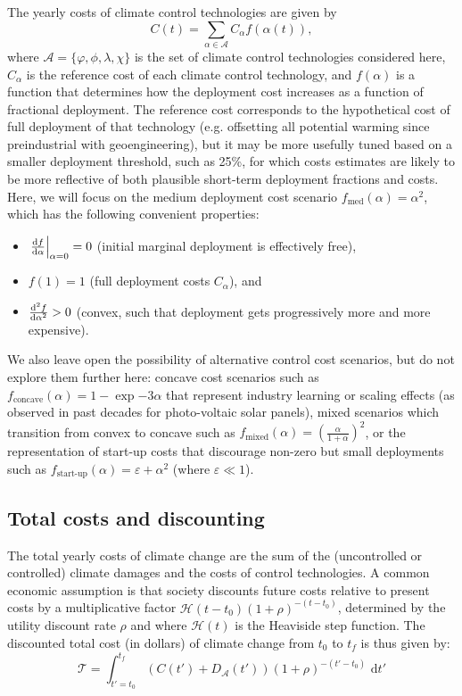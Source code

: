 \documentclass{article}
\begin{document}
The yearly costs of climate control technologies are given by
\begin{equation}
    C(t) = \sum_{\alpha \in \mathcal{A}} C_{\alpha} f(\alpha(t)),
\end{equation}
where $\mathcal{A} = \{ \varphi, \phi, \lambda, \chi \}$ is the set of climate control technologies considered here, $C_{\alpha}$ is the reference cost of each climate control technology, and $f(\alpha)$ is a function that determines how the deployment cost increases as a function of fractional deployment. The reference cost corresponds to the hypothetical cost of full deployment of that technology (e.g. offsetting all potential warming since preindustrial with geoengineering), but it may be more usefully tuned based on a smaller deployment threshold, such as 25\%, for which costs estimates are likely to be more reflective of both plausible short-term deployment fractions and costs. Here, we will focus on the medium deployment cost scenario $f_{\text{med}}(\alpha) = \alpha^{2}$, which has the following convenient properties: 
\begin{itemize}
    \item $\left. \dv{f}{\alpha}\right|_{\alpha=0} = 0$ (initial marginal deployment is effectively free),
    \item $f(1) = 1$ (full deployment costs $C_{\alpha}$), and
    \item $\dv[2]{f}{\alpha} > 0$ (convex, such that deployment gets progressively more and more expensive).
\end{itemize}
We also leave open the possibility of alternative control cost scenarios, but do not explore them further here: concave cost scenarios such as $f_{\text{concave}}(\alpha) = 1-\exp{-3\alpha}$ that represent industry learning or scaling effects (as observed in past decades for photo-voltaic solar panels), mixed scenarios which transition from convex to concave such as $f_{\text{mixed}}(\alpha) = 
\left( \frac{\alpha}{1 + \alpha} \right)^{2}$, or the representation of start-up costs that discourage non-zero but small deployments such as $f_{\text{start-up}}(\alpha) = \varepsilon +  \alpha^{2}$ (where $\varepsilon \ll 1$).

\subsection{Total costs and discounting}

The total yearly costs of climate change are the sum of the (uncontrolled or controlled) climate damages and the costs of control technologies. A common economic assumption is that society discounts future costs relative to present costs by a multiplicative factor $\mathcal{H}(t-t_{0})(1 + \rho)^{-(t-t_{0})}$, determined by the utility discount rate $\rho$ and where $\mathcal{H}(t)$ is the Heaviside step function. The discounted total cost (in dollars) of climate change from $t_{0}$ to $t_{f}$ is thus given by:
\begin{equation}
    \mathcal{T} =
    \int_{t'=t_{0}}^{t_{f}}
    (C(t') + D_{\mathcal{A}}(t')) (1 + \rho)^{-(t'-t_{0})} \text{ d}t'
\end{equation}
\end{document}
